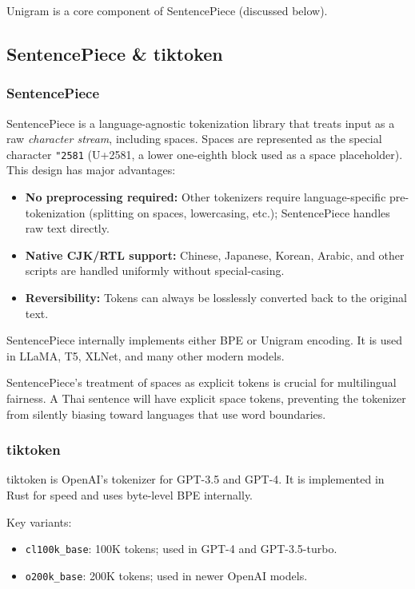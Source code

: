 Unigram is a core component of SentencePiece (discussed below).

\subsection{SentencePiece \& tiktoken}

\subsubsection*{SentencePiece}

SentencePiece is a language-agnostic tokenization library that treats input as a raw \emph{character stream}, including spaces. Spaces are represented as the special character \texttt{\char"2581} (U+2581, a lower one-eighth block used as a space placeholder). This design has major advantages:

\begin{itemize}
  \item \textbf{No preprocessing required:} Other tokenizers require language-specific pre-tokenization (splitting on spaces, lowercasing, etc.); SentencePiece handles raw text directly.
  \item \textbf{Native CJK/RTL support:} Chinese, Japanese, Korean, Arabic, and other scripts are handled uniformly without special-casing.
  \item \textbf{Reversibility:} Tokens can always be losslessly converted back to the original text.
\end{itemize}

SentencePiece internally implements either BPE or Unigram encoding. It is used in LLaMA, T5, XLNet, and many other modern models.

\begin{notebox}
SentencePiece's treatment of spaces as explicit tokens is crucial for multilingual fairness. A Thai sentence will have explicit space tokens, preventing the tokenizer from silently biasing toward languages that use word boundaries.
\end{notebox}

\subsubsection*{tiktoken}

tiktoken is OpenAI's tokenizer for GPT-3.5 and GPT-4. It is implemented in Rust for speed and uses byte-level BPE internally.

Key variants:
\begin{itemize}
  \item \texttt{cl100k\_base}: 100K tokens; used in GPT-4 and GPT-3.5-turbo.
  \item \texttt{o200k\_base}: 200K tokens; used in newer OpenAI models.
\end{itemize}

